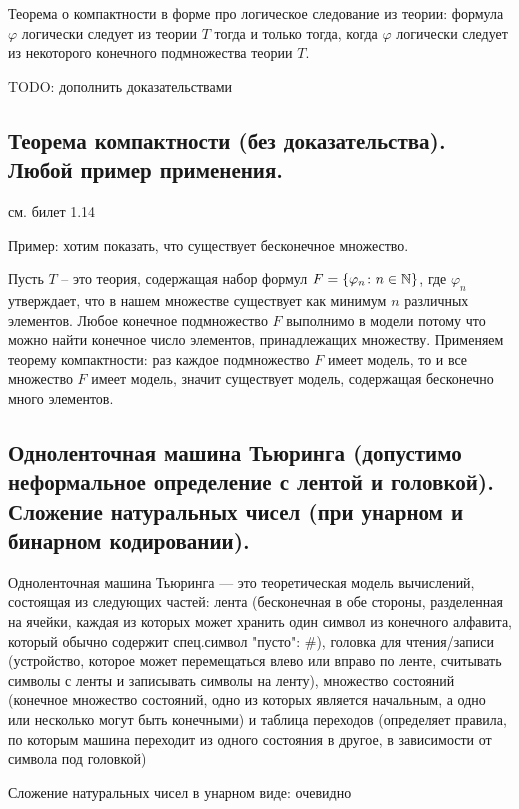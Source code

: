 \documentclass[a4paper, 10pt]{article}
\begin{document}
Теорема о компактности в форме про логическое следование из теории: формула $\varphi$ логически следует из теории $T$ тогда и только тогда, когда $\varphi$ логически следует из некоторого конечного подмножества теории $T$.

TODO: дополнить доказательствами

\subsection{Теорема компактности (без доказательства). Любой пример применения.}

см. билет 1.14

Пример: хотим показать, что существует бесконечное множество.

Пусть $T$ -- это теория, содержащая набор формул $F=\{\varphi_n \colon n \in \mathbb{N}\}$, где $\varphi_n$ утверждает, что в нашем множестве существует как минимум $n$ различных элементов. Любое конечное подмножество $F$ выполнимо в модели потому что можно найти конечное число элементов, принадлежащих множеству. Применяем теорему компактности: раз каждое подмножество $F$ имеет модель, то и все множество $F$ имеет модель, значит существует модель, содержащая бесконечно много элементов.

\subsection{Одноленточная машина Тьюринга (допустимо неформальное определение с лентой и головкой). Сложение натуральных чисел (при унарном и бинарном кодировании).}

Одноленточная машина Тьюринга — это теоретическая модель вычислений, состоящая из следующих частей: лента (бесконечная в обе стороны, разделенная на ячейки, каждая из которых может хранить один символ из конечного алфавита, который обычно содержит спец.символ "пусто": $\#$), головка для чтения/записи (устройство, которое может перемещаться влево или вправо по ленте, считывать символы с ленты и записывать символы на ленту), множество состояний (конечное множество состояний, одно из которых является начальным, а одно или несколько могут быть конечными) и таблица переходов (определяет правила, по которым машина переходит из одного состояния в другое, в зависимости от символа под головкой)

Сложение натуральных чисел в унарном виде: очевидно
\end{document}
